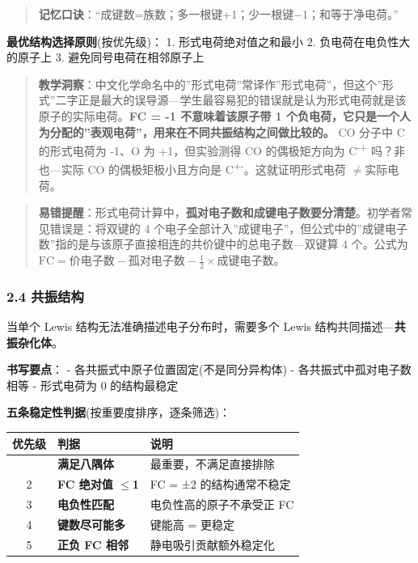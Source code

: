 \documentclass[a4paper,11pt]{ctexart}
\newcounter{none}
\newcommand{\箭}{\ensuremath{\rightarrow}}
\newcommand{\左箭}{\ensuremath{\leftarrow}}
\newcommand{\上箭}{\ensuremath{\uparrow}}
\newcommand{\下箭}{\ensuremath{\downarrow}}
\newcommand{\衡}{\ensuremath{\rightleftharpoons}}
\newcommand{\双箭}{\ensuremath{\leftrightarrow}}
\newcommand{\约等于}{\ensuremath{\approx}}
\newcommand{\小于等于}{\ensuremath{\leq}}
\newcommand{\大于等于}{\ensuremath{\geq}}
\newcommand{\不等于}{\ensuremath{\neq}}
\newcommand{\西格马}{\ensuremath{\sigma}}
\newcommand{\派}{\ensuremath{\pi}}
\begin{document}
\begin{quote}
\textbf{记忆口诀}：``成键数=族数；多一根键+1；少一根键−1；和等于净电荷。''
\end{quote}

\textbf{最优结构选择原则}(按优先级)：
1. 形式电荷绝对值之和最小
2. 负电荷在电负性大的原子上
3. 避免同号电荷在相邻原子上

\begin{quote}
\textbf{教学洞察}：中文化学命名中的''形式电荷''常译作''形式电荷''，但这个''形式''二字正是最大的误导源---学生最容易犯的错误就是认为形式电荷就是该原子的实际电荷。\textbf{FC = -1 不意味着该原子带 1 个负电荷，它只是一个人为分配的''表观电荷''，用来在不同共振结构之间做比较的。} CO 分子中 C 的形式电荷为 -1、O 为 +1，但实验测得 CO 的偶极矩方向为 C\textsuperscript{-}\textsuperscript{+} 吗？非也---实际 CO 的偶极矩极小且方向是 C\textsuperscript{+}\textsuperscript{-}。这就证明形式电荷 \不等于 实际电荷。
\end{quote}

\begin{quote}
\textbf{易错提醒}：形式电荷计算中，\textbf{孤对电子数和成键电子数要分清楚}。初学者常见错误是：将双键的 4 个电子全部计入''成键电子''，但公式中的''成键电子数''指的是与该原子直接相连的共价键中的总电子数---双键算 4 个。公式为 \(\text{FC} = \text{价电子数} - \text{孤对电子数} - \frac{1}{2} \times \text{成键电子数}\)。
\end{quote}

\subsubsection{2.4 共振结构}\label{ux5171ux632fux7ed3ux6784}

当单个 Lewis 结构无法准确描述电子分布时，需要多个 Lewis 结构共同描述---\textbf{共振杂化体}。

\textbf{书写要点}：
- 各共振式中原子位置固定(不是同分异构体)
- 各共振式中孤对电子数相等
- 形式电荷为 0 的结构最稳定

\textbf{五条稳定性判据}(按重要度排序，逐条筛选)：

{\def\LTcaptype{none} %
\begin{longtable}[]{@{}cll@{}}
\toprule\noalign{}
优先级 & 判据 & 说明 \\
\midrule\noalign{}
\endhead
\bottomrule\noalign{}
\endlastfoot
1 & \textbf{满足八隅体} & 最重要，不满足直接排除 \\
2 & \textbf{FC 绝对值 \小于等于 1} & FC = ±2 的结构通常不稳定 \\
3 & \textbf{电负性匹配} & 电负性高的原子不承受正 FC \\
4 & \textbf{键数尽可能多} & 键能高 = 更稳定 \\
5 & \textbf{正负 FC 相邻} & 静电吸引贡献额外稳定化 \\
\end{longtable}
}
\end{document}
